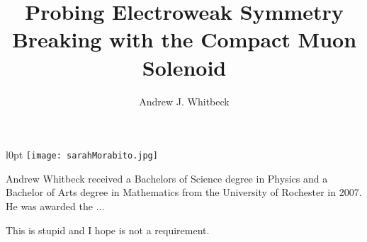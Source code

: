 \documentclass[12pt,oneside,final]{thesis}
\begin{document}
\title{Probing Electroweak Symmetry Breaking with the Compact Muon Solenoid}
\author{Andrew J. Whitbeck}
\dissertation
\doctorphilosophy
\copyrightnotice
















\begin{vita}

\begin{wrapfigure}{l}{0pt}
\texttt{[image: sarahMorabito.jpg]}
\end{wrapfigure}

Andrew Whitbeck received a Bachelors of Science degree in Physics and 
a Bachelor of Arts degree in Mathematics from the University of Rochester 
in 2007.  He was awarded the ...

This is stupid and I hope is not a requirement.

\end{vita}
\end{document}
